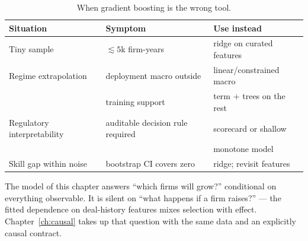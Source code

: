 \begin{table}[htbp]
\centering
\caption{When gradient boosting is the wrong tool.}
\label{tab:xgb-decision}
\begin{tabular}{@{}lll@{}}
\toprule
Situation & Symptom & Use instead \\
\midrule
Tiny sample & $\lesssim 5$k firm-years & ridge on curated features \\
Regime extrapolation & deployment macro outside & linear/constrained macro \\
 & training support & term $+$ trees on the rest \\
Regulatory interpretability & auditable decision rule required & scorecard or shallow \\
 & & monotone model \\
Skill gap within noise & bootstrap CI covers zero & ridge; revisit features \\
\bottomrule
\end{tabular}
\end{table}

The model of this chapter answers ``which firms will grow?'' conditional on everything
observable. It is silent on ``what happens if a firm raises?'' --- the fitted dependence
on deal-history features mixes selection with effect. Chapter~\ref{ch:causal} takes up
that question with the same data and an explicitly causal contract.
